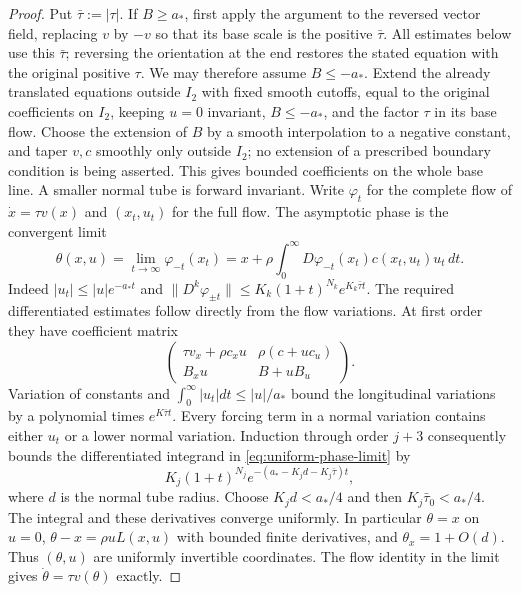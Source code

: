 \begin{proof}
 Put $\bar\tau:=|\tau|$. If $B\ge a_*$, first apply the argument to the
 reversed vector field, replacing $v$ by $-v$ so that its base scale is the
 positive $\bar\tau$. All estimates below use this $\bar\tau$; reversing the
 orientation at the end restores the stated equation with the original
 positive $\tau$. We may therefore assume $B\le-a_*$. Extend the already
 translated equations outside $I_2$ with fixed smooth cutoffs, equal to the
 original coefficients on $I_2$, keeping $u=0$ invariant, $B\le-a_*$, and
 the factor $\tau$ in its base flow. Choose the extension of $B$ by a smooth
 interpolation to a negative constant, and taper $v,c$ smoothly only outside
 $I_2$; no extension of a prescribed boundary condition is being asserted.
 This gives bounded coefficients on the whole base line. A smaller normal
 tube is forward invariant. Write $\varphi_t$ for the complete flow of
 $\dot x=\tau v(x)$ and $(x_t,u_t)$ for the full flow.
The asymptotic phase is the convergent limit
\begin{equation}\label{eq:uniform-phase-limit}
 \theta(x,u)=\lim_{t\to\infty}\varphi_{-t}(x_t)
 =x+\rho\int_0^\infty
 D\varphi_{-t}(x_t)c(x_t,u_t)u_t\,dt.
\end{equation}
Indeed $|u_t|\le |u|e^{-a_*t}$ and
$\|D^k\varphi_{\pm t}\|\le K_k(1+t)^{N_k}e^{K_k\bar\tau t}$.
The required differentiated estimates follow directly from the flow
variations. At first order they have coefficient matrix
\[
 \begin{pmatrix}
 \tau v_x+\rho c_xu&\rho(c+uc_u)\\
 B_xu&B+uB_u
 \end{pmatrix}.
\]
Variation of constants and $\int_0^\infty|u_t|dt\le |u|/a_*$
bound the longitudinal variations by a polynomial times
$e^{K\bar\tau t}$.
Every forcing term in a normal variation contains either $u_t$ or a
lower normal variation. Induction through order $j+3$ consequently
bounds the differentiated integrand in \eqref{eq:uniform-phase-limit}
by
\[
 K_j(1+t)^{N_j}
       e^{-(a_*-K_jd-K_j\bar\tau)t},
\]
where $d$ is the normal tube radius. Choose $K_jd<a_*/4$ and then
$K_j\bar\tau_0<a_*/4$. The integral and these derivatives converge
uniformly. In particular $\theta=x$ on $u=0$,
$\theta-x=\rho u L(x,u)$ with bounded finite derivatives, and
$\theta_x=1+O(d)$. Thus $(\theta,u)$ are uniformly invertible
coordinates. The flow identity in the limit gives
$\dot\theta=\tau v(\theta)$ exactly.


\end{proof}
